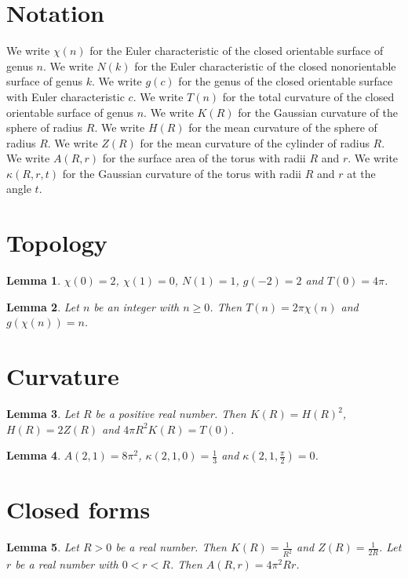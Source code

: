 \documentclass{article}
\newtheorem{lemma}{Lemma}
\begin{document}
\section{Notation}

We write $\chi(n)$ for the Euler characteristic of the closed orientable surface of genus $n$.
We write $N(k)$ for the Euler characteristic of the closed nonorientable surface of genus $k$.
We write $g(c)$ for the genus of the closed orientable surface with Euler characteristic $c$.
We write $T(n)$ for the total curvature of the closed orientable surface of genus $n$.
We write $K(R)$ for the Gaussian curvature of the sphere of radius $R$.
We write $H(R)$ for the mean curvature of the sphere of radius $R$.
We write $Z(R)$ for the mean curvature of the cylinder of radius $R$.
We write $A(R,r)$ for the surface area of the torus with radii $R$ and $r$.
We write $\kappa(R,r,t)$ for the Gaussian curvature of the torus with radii $R$ and $r$ at the angle $t$.

\section{Topology}

\begin{lemma}\label{values}
$\chi(0)=2$, $\chi(1)=0$, $N(1)=1$, $g(-2)=2$ and $T(0)=4\pi$.
\end{lemma}

\begin{lemma}\label{bonnet}
Let $n$ be an integer with $n\ge0$. Then $T(n)=2\pi\chi(n)$ and $g(\chi(n))=n$.
\end{lemma}

\section{Curvature}

\begin{lemma}\label{sphere}
Let $R$ be a positive real number. Then $K(R)=H(R)^2$, $H(R)=2Z(R)$ and $4\pi R^2K(R)=T(0)$.
\end{lemma}

\begin{lemma}\label{torus}
$A(2,1)=8\pi^2$, $\kappa(2,1,0)=\frac13$ and $\kappa(2,1,\frac{\pi}{2})=0$.
\end{lemma}

\section{Closed forms}

\begin{lemma}\label{closed}
Let $R>0$ be a real number. Then $K(R)=\frac{1}{R^2}$ and $Z(R)=\frac{1}{2R}$. Let $r$ be a real number with $0<r<R$. Then $A(R,r)=4\pi^2Rr$.
\end{lemma}
\end{document}
